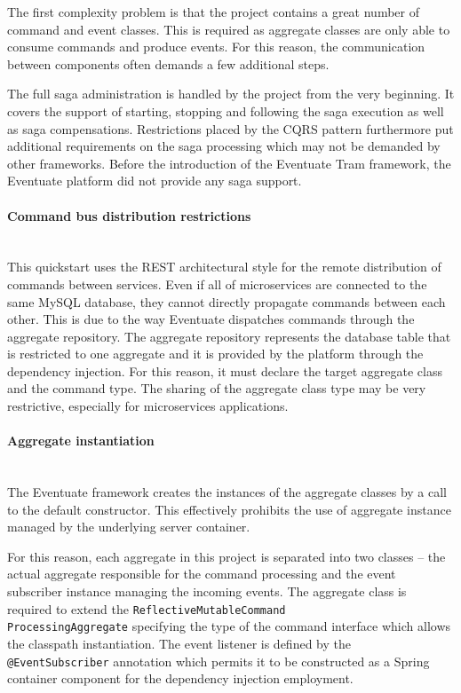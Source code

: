 \documentclass[oneside,
  digital, %
  table,   %
  lof,     %
  lot,     %
]{fithesis3}
\newcommand{\newlinepar}[1]{\paragraph{#1}\needspace{4\baselineskip}\mbox{}\\}
\begin{document}
The first complexity problem is that the project contains a great number of command and event classes. This is required as aggregate classes are only able to consume commands and produce events. For this reason,  the communication between components often demands a few additional steps.

The full saga administration is handled by the project from the very beginning. It covers the support of starting, stopping and following the saga execution as well as saga compensations. Restrictions placed by the CQRS pattern furthermore put additional requirements on the saga processing which may not be demanded by other frameworks. Before the introduction of the Eventuate Tram framework, the Eventuate platform did not provide any saga support.

\newlinepar{Command bus distribution restrictions}

This quickstart uses the REST architectural style for the remote distribution of commands between services. Even if all of microservices are connected to the same MySQL database, they cannot directly propagate commands between each other. This is due to the way Eventuate dispatches commands through the aggregate repository. The aggregate repository represents the database table that is restricted to one aggregate and it is provided by the platform through the dependency injection. For this reason, it must declare the target aggregate class and the command type. The sharing of the aggregate class type may be very restrictive, especially for microservices applications.

\newlinepar{Aggregate instantiation}

The Eventuate framework creates the instances of the aggregate classes by a call to the default constructor. This effectively prohibits the use of aggregate instance managed by the underlying server container. 

For this reason, each aggregate in this project is separated into two classes -- the actual aggregate responsible for the command processing and the event subscriber instance managing the incoming events. The  aggregate class is required to extend the \texttt{ReflectiveMutableCommand\\ProcessingAggregate} specifying the type of the command interface which allows the classpath instantiation. The event listener is defined by the \texttt{@EventSubscriber} annotation which permits it to be constructed as a Spring container component for the dependency injection employment. 
\end{document}
